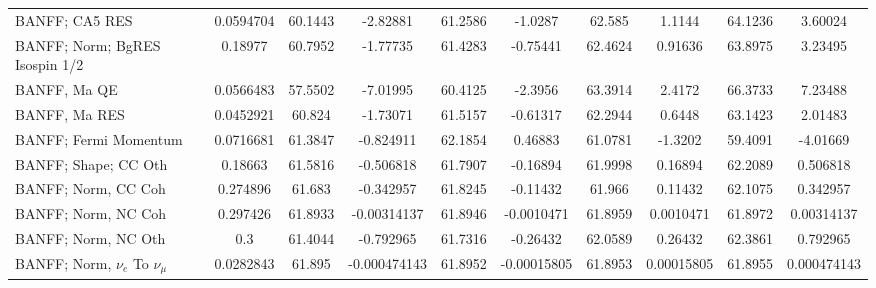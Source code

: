 \begin{tabular}{| l | S | S  S | S  S | S  S | S  S | }
                                                                  BANFF; CA5 RES &       0.0594704 &         60.1443 &        -2.82881 &         61.2586 &         -1.0287 &          62.585 &          1.1144 &         64.1236 &         3.60024 \\ 
                                                  BANFF; Norm; BgRES Isospin 1/2 &         0.18977 &         60.7952 &        -1.77735 &         61.4283 &        -0.75441 &         62.4624 &         0.91636 &         63.8975 &         3.23495 \\ 
                                                                    BANFF, Ma QE &       0.0566483 &         57.5502 &        -7.01995 &         60.4125 &         -2.3956 &         63.3914 &          2.4172 &         66.3733 &         7.23488 \\ 
                                                                   BANFF, Ma RES &       0.0452921 &          60.824 &        -1.73071 &         61.5157 &        -0.61317 &         62.2944 &          0.6448 &         63.1423 &         2.01483 \\ 
                                                           BANFF; Fermi Momentum &       0.0716681 &         61.3847 &       -0.824911 &         62.1854 &         0.46883 &         61.0781 &         -1.3202 &         59.4091 &        -4.01669 \\ 
                                                            BANFF; Shape; CC Oth &         0.18663 &         61.5816 &       -0.506818 &         61.7907 &        -0.16894 &         61.9998 &         0.16894 &         62.2089 &        0.506818 \\ 
                                                             BANFF; Norm, CC Coh &        0.274896 &          61.683 &       -0.342957 &         61.8245 &        -0.11432 &          61.966 &         0.11432 &         62.1075 &        0.342957 \\ 
                                                             BANFF; Norm, NC Coh &        0.297426 &         61.8933 &     -0.00314137 &         61.8946 &      -0.0010471 &         61.8959 &       0.0010471 &         61.8972 &      0.00314137 \\ 
                                                             BANFF; Norm, NC Oth &             0.3 &         61.4044 &       -0.792965 &         61.7316 &        -0.26432 &         62.0589 &         0.26432 &         62.3861 &        0.792965 \\ 
                                           BANFF; Norm, $\nu_{e}$ To $\nu_{\mu}$ &       0.0282843 &          61.895 &    -0.000474143 &         61.8952 &     -0.00015805 &         61.8953 &      0.00015805 &         61.8955 &     0.000474143 \\ 

\end{tabular}
